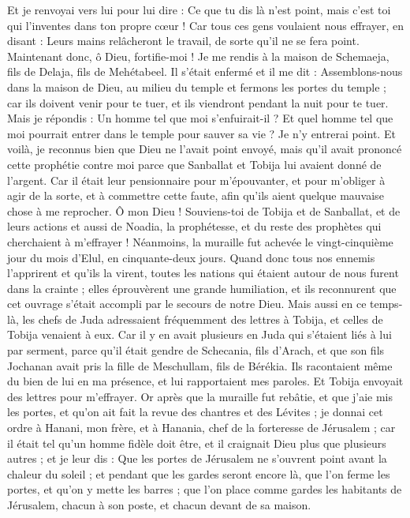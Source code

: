 \begin{multicols}{2}
Et je renvoyai vers lui pour lui dire : Ce que tu dis là n'est point, mais c'est toi qui l'inventes dans ton propre cœur !
Car tous ces gens voulaient nous effrayer, en disant : Leurs mains relâcheront le travail, de sorte qu'il ne se fera point. Maintenant donc, ô Dieu, fortifie-moi !
Je me rendis à la maison de Schemaeja, fils de Delaja, fils de Mehétabeel. Il s'était enfermé et il me dit : Assemblons-nous dans la maison de Dieu, au milieu du temple et fermons les portes du temple ; car ils doivent venir pour te tuer, et ils viendront pendant la nuit pour te tuer.
Mais je répondis : Un homme tel que moi s'enfuirait-il ? Et quel homme tel que moi pourrait entrer dans le temple pour sauver sa vie ? Je n'y entrerai point.
Et voilà, je reconnus bien que Dieu ne l'avait point envoyé, mais qu'il avait prononcé cette prophétie contre moi parce que Sanballat et Tobija lui avaient donné de l'argent.
Car il était leur pensionnaire pour m'épouvanter, et pour m'obliger à agir de la sorte, et à commettre cette faute, afin qu'ils aient quelque mauvaise chose à me reprocher.
Ô mon Dieu ! Souviens-toi de Tobija et de Sanballat, et de leurs actions et aussi de Noadia, la prophétesse, et du reste des prophètes qui cherchaient à m'effrayer !
Néanmoins, la muraille fut achevée le vingt-cinquième jour du mois d'Elul, en cinquante-deux jours.
Quand donc tous nos ennemis l'apprirent et qu'ils la virent, toutes les nations qui étaient autour de nous furent dans la crainte ; elles éprouvèrent une grande humiliation, et ils reconnurent que cet ouvrage s'était accompli par le secours de notre Dieu.
Mais aussi en ce temps-là, les chefs de Juda adressaient fréquemment des lettres à Tobija, et celles de Tobija venaient à eux.
Car il y en avait plusieurs en Juda qui s'étaient liés à lui par serment, parce qu'il était gendre de Schecania, fils d'Arach, et que son fils Jochanan avait pris la fille de Meschullam, fils de Bérékia.
Ils racontaient même du bien de lui en ma présence, et lui rapportaient mes paroles. Et Tobija envoyait des lettres pour m'effrayer.
\VerseOne{}Or après que la muraille fut rebâtie, et que j'aie mis les portes, et qu'on ait fait la revue des chantres et des Lévites ; 
je donnai cet ordre à Hanani, mon frère, et à Hanania, chef de la forteresse de Jérusalem ; car il était tel qu'un homme fidèle doit être, et il craignait Dieu plus que plusieurs autres ;
et je leur dis : Que les portes de Jérusalem ne s'ouvrent point avant la chaleur du soleil ; et pendant que les gardes seront encore là, que l'on ferme les portes, et qu'on y mette les barres ; que l'on place comme gardes les habitants de Jérusalem, chacun à son poste, et chacun devant de sa maison.

\end{multicols}

